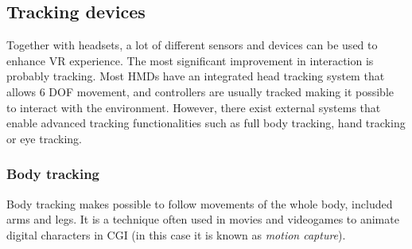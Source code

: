 \documentclass[binding=0.6cm,LaM]{sapthesis}
\begin{document}
\subsection{Tracking devices}	
Together with headsets, a lot of different sensors and devices can be used to enhance VR experience. The most significant improvement in interaction is probably tracking. Most HMDs have an integrated head tracking system that allows 6 DOF movement, and controllers are usually tracked making it possible to interact with the environment. However, there exist external systems that enable advanced tracking functionalities such as full body tracking, hand tracking or eye tracking.

\subsubsection{Body tracking}
Body tracking makes possible to follow movements of the whole body, included arms and legs. It is a technique often used in movies and videogames to animate digital characters in CGI (in this case it is known as \textit{motion capture}). 
\end{document}
